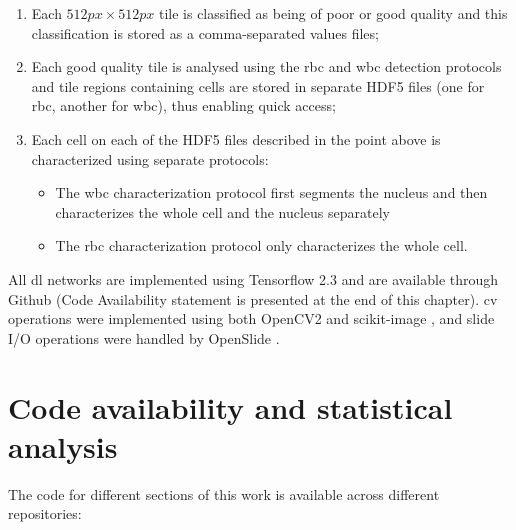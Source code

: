 \begin{enumerate}
    \item Each $512px \times 512px$ tile is classified as being of poor or good quality and this classification is stored as a comma-separated values files;
    \item Each good quality tile is analysed using the \ac{rbc} and \ac{wbc} detection protocols and tile regions containing cells are stored in separate HDF5 files (one for \ac{rbc}, another for \ac{wbc}), thus enabling quick access;
    \item Each cell on each of the HDF5 files described in the point above is characterized using separate protocols:
    \begin{itemize}
        \item The \ac{wbc} characterization protocol first segments the nucleus and then characterizes the whole cell and the nucleus separately
        \item The \ac{rbc} characterization protocol only characterizes the whole cell.
    \end{itemize}
\end{enumerate}

\begin{figure}[!ht]
    \label{fig:pipeline-schematic}
\end{figure}

All \ac{dl} networks are implemented using Tensorflow 2.3 \cite{tensorflow2015-whitepaper} and are available through Github (Code Availability statement is presented at the end of this chapter). \Ac{cv} operations were implemented using both OpenCV2 \cite{opencv_library} and scikit-image \cite{van2014scikit}, and slide I/O operations were handled by OpenSlide \cite{Goode2013-zs}.

\section{Code availability and statistical analysis}

The code for different sections of this work is available across different repositories:

